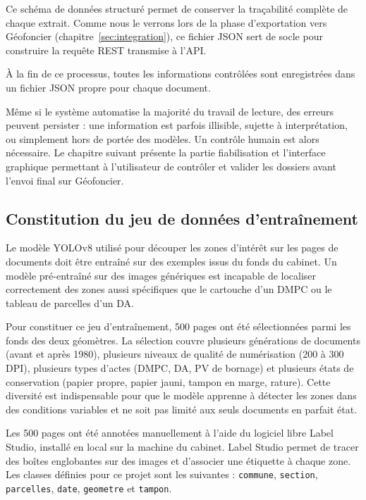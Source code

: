 Ce schéma de données structuré permet de conserver la traçabilité complète de chaque extrait. Comme nous le verrons lors de la phase d'exportation vers Géofoncier (chapitre~\ref{sec:integration}), ce fichier JSON sert de socle pour construire la requête REST transmise à l'API.


À la fin de ce processus, toutes les informations contrôlées sont enregistrées dans un fichier JSON propre pour chaque document.

Même si le système automatise la majorité du travail de lecture, des erreurs peuvent persister : une information est parfois illisible, sujette à interprétation, ou simplement hors de portée des modèles. Un contrôle humain est alors nécessaire. Le chapitre suivant présente la partie fiabilisation et l'interface graphique permettant à l'utilisateur de contrôler et valider les dossiers avant l'envoi final sur Géofoncier.


\subsection{Constitution du jeu de données d'entraînement}

Le modèle YOLOv8 utilisé pour découper les zones d'intérêt sur les pages de documents doit être entraîné sur des exemples issus du fonds du cabinet. Un modèle pré-entraîné sur des images génériques est incapable de localiser correctement des zones aussi spécifiques que le cartouche d'un DMPC ou le tableau de parcelles d'un DA.

Pour constituer ce jeu d'entraînement, 500 pages ont été sélectionnées parmi les fonds des deux géomètres. La sélection couvre plusieurs générations de documents (avant et après 1980), plusieurs niveaux de qualité de numérisation (200 à 300 DPI), plusieurs types d'actes (DMPC, DA, PV de bornage) et plusieurs états de conservation (papier propre, papier jauni, tampon en marge, rature). Cette diversité est indispensable pour que le modèle apprenne à détecter les zones dans des conditions variables et ne soit pas limité aux seuls documents en parfait état.

Les 500 pages ont été annotées manuellement à l'aide du logiciel libre Label Studio, installé en local sur la machine du cabinet. Label Studio permet de tracer des boîtes englobantes sur des images et d'associer une étiquette à chaque zone. Les classes définies pour ce projet sont les suivantes : \texttt{commune}, \texttt{section}, \texttt{parcelles}, \texttt{date}, \texttt{geometre} et \texttt{tampon}.



